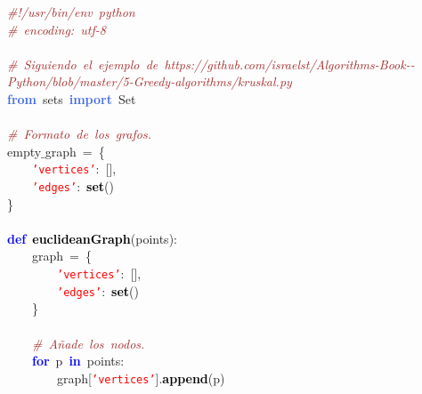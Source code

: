 \noindent
\mbox{}\textit{\textcolor{Brown}{\#!/usr/bin/env\ python}} \\
\mbox{}\textit{\textcolor{Brown}{\#\ encoding:\ utf-8}} \\
\mbox{} \\
\mbox{}\textit{\textcolor{Brown}{\#\ Siguiendo\ el\ ejemplo\ de\ https://github.com/israelst/Algorithms-Book-\/-Python/blob/master/5-Greedy-algorithms/kruskal.py}} \\
\mbox{}\textbf{\textcolor{RoyalBlue}{from}}\ sets\ \textbf{\textcolor{RoyalBlue}{import}}\ Set \\
\mbox{} \\
\mbox{}\textit{\textcolor{Brown}{\#\ Formato\ de\ los\ grafos.}} \\
\mbox{}empty$\_$graph\ \textcolor{BrickRed}{=}\ \textcolor{BrickRed}{\{} \\
\mbox{}\ \ \ \ \texttt{\textcolor{Red}{'vertices'}}\textcolor{BrickRed}{:}\ \textcolor{BrickRed}{[],} \\
\mbox{}\ \ \ \ \texttt{\textcolor{Red}{'edges'}}\textcolor{BrickRed}{:}\ \textbf{\textcolor{Black}{set}}\textcolor{BrickRed}{()} \\
\mbox{}\textcolor{BrickRed}{\}} \\
\mbox{} \\
\mbox{}\textbf{\textcolor{Blue}{def}}\ \textbf{\textcolor{Black}{euclideanGraph}}\textcolor{BrickRed}{(}points\textcolor{BrickRed}{):} \\
\mbox{}\ \ \ \ graph\ \textcolor{BrickRed}{=}\ \textcolor{BrickRed}{\{} \\
\mbox{}\ \ \ \ \ \ \ \ \texttt{\textcolor{Red}{'vertices'}}\textcolor{BrickRed}{:}\ \textcolor{BrickRed}{[],} \\
\mbox{}\ \ \ \ \ \ \ \ \texttt{\textcolor{Red}{'edges'}}\textcolor{BrickRed}{:}\ \textbf{\textcolor{Black}{set}}\textcolor{BrickRed}{()} \\
\mbox{}\ \ \ \ \textcolor{BrickRed}{\}} \\
\mbox{} \\
\mbox{}\ \ \ \ \textit{\textcolor{Brown}{\#\ Añade\ los\ nodos.}} \\
\mbox{}\ \ \ \ \textbf{\textcolor{Blue}{for}}\ p\ \textbf{\textcolor{Blue}{in}}\ points\textcolor{BrickRed}{:} \\
\mbox{}\ \ \ \ \ \ \ \ graph\textcolor{BrickRed}{[}\texttt{\textcolor{Red}{'vertices'}}\textcolor{BrickRed}{].}\textbf{\textcolor{Black}{append}}\textcolor{BrickRed}{(}p\textcolor{BrickRed}{)} \\
